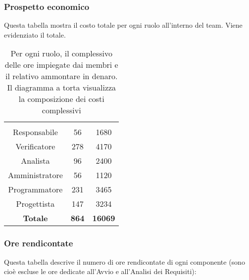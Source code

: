 \subsubsection{Prospetto economico}
Questa tabella mostra il costo totale per ogni ruolo all'interno del team. Viene evidenziato il totale.

\begin{table}[H]
	{\setlength{\parindent}{0cm}
		\begin{minipage}{.43\textwidth}
			\begin{tabular}{ccc}
				\rowcolorhead
				\headertitle{Ruolo} & \headertitle{Ore} & \headertitle{Costo(€)}\\
				Responsabile & 56 & 1680\\
				Verificatore & 278 & 4170\\
				Analista & 96 & 2400\\
				Amministratore & 56 & 1120\\
				Programmatore & 231 & 3465\\
				Progettista & 147 & 3234\\
				\hline
				\textbf{Totale} & \textbf{864} & \textbf{16069}\\
			\end{tabular}
		\end{minipage}%
		\begin{minipage}{.57\textwidth}
	\end{minipage} }
	\caption[Prospetto economico complessivo]{Per ogni ruolo, il complessivo delle ore impiegate dai membri e il relativo ammontare in denaro. Il diagramma a torta visualizza la composizione dei costi complessivi}
\end{table}


\subsubsection{Ore rendicontate}


Questa tabella descrive il numero di ore rendicontate di ogni componente (sono cioè escluse le ore dedicate all'Avvio e all'Analisi dei Requisiti):


